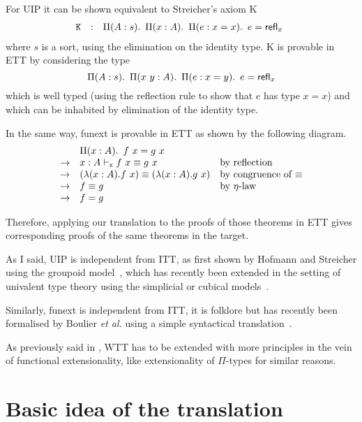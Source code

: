 For \acrshort{UIP} it can be shown equivalent to Streicher's axiom K
\[
\begin{array}{rcl}
  \mathtt{K} & : & \mathop{\Pi(A: s).\ } \mathop{\Pi(x :A).\ } \mathop{\Pi(e : x = x).\ } e = {\mathsf{refl}}_{x}\  \\
\end{array}
\]
where \(s\) is a sort, using the elimination on the identity type.
K is provable in \acrshort{ETT} by considering the type
\[
  \mathop{\Pi(A: s).\ } \mathop{\Pi(x \ y:A).\ } \mathop{\Pi(e : x = y).\ } e = {\mathsf{refl}}_{x}\  \\
\]
which is well typed (using the reflection rule to show that $e$ has
type $x= x$) and which can be inhabited by elimination of the identity
type.

In the same way, \acrshort{funext} is provable in \acrshort{ETT} as shown by the
following diagram.
\[
\begin{array}{cll}
  &\mathop{\Pi(x : A).\ } f\ x = g\ x \\
  \to & x : A \vdash_{\mathsf{x}} f\ x \equiv g\ x &
  \mbox{by reflection} \\
  \to &  (\lambda (x:A). {f \ x}) \equiv (\lambda{(x:A)}.{g \ x}) &
  \mbox{by congruence of $\equiv$} \\
  \to &  f \equiv g & \mbox{by $\eta$-law} \\
  \to &  f = g
\end{array}
\]

Therefore, applying our translation to the proofs of those theorems in
\acrshort{ETT} gives corresponding proofs of the same theorems in the target.

As I said, \acrshort{UIP} is independent from \acrshort{ITT}, as first shown by
Hofmann and Streicher using the groupoid model~, which
has recently been extended in the setting of univalent type theory using the
simplicial or cubical models~.

Similarly, \acrshort{funext} is independent from \acrshort{ITT}, it is folklore
but has recently been formalised by Boulier \emph{et al.} using a simple
syntactical translation~.

As previously said in , \acrshort{WTT} has to be extended with
more principles in the vein of functional extensionality, like extensionality
of \(\Pi\)-types for similar reasons.

\section{Basic idea of the translation}

